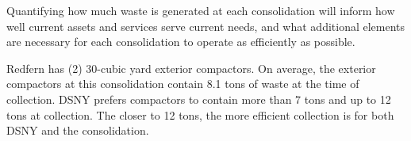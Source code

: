 
    Quantifying how much waste is generated at each consolidation will inform how well current assets and services serve current needs, and what additional elements are necessary for each consolidation to operate as efficiently as possible.
    
    Redfern has (2) 30-cubic yard exterior compactors. On average, the exterior compactors at this consolidation contain 8.1 tons of waste at the time of collection. DSNY prefers compactors to contain more than 7 tons and up to 12 tons at collection. The closer to 12 tons, the more efficient collection is for both DSNY and the consolidation.